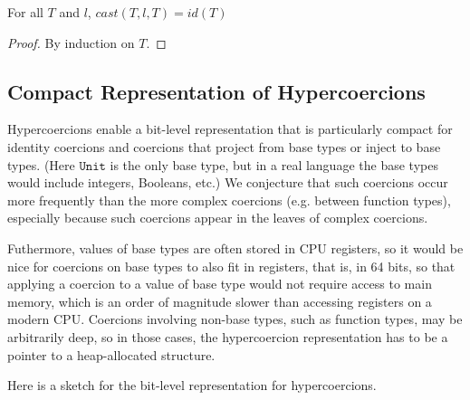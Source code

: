 \documentclass[acmsmall,review]{acmart}\settopmatter{printfolios=true,printccs=false,printacmref=false}
\newcommand{\lazyUD}{Lazy\;UD}
\newcommand{\POOunit}[0]{\mathtt{Unit}}
\begin{document}
\begin{proposition}[\lazyUD{} Identity Casts]
  For all $T$ and $l$, $cast(T,l,T) = id(T) $
\end{proposition}
\begin{proof}
  By induction on $T$.
\end{proof}


\subsection{Compact Representation of Hypercoercions}

Hypercoercions enable a bit-level representation that is particularly
compact for identity coercions and coercions that project from base
types or inject to base types.  (Here $\POOunit$ is the only base
type, but in a real language the base types would include integers,
Booleans, etc.)  We conjecture that such coercions occur more
frequently than the more complex coercions (e.g. between function
types), especially because such coercions appear in the leaves of
complex coercions.

Futhermore, values of base types are often stored in CPU registers, so
it would be nice for coercions on base types to also fit in registers,
that is, in 64 bits, so that applying a coercion to a value of base
type would not require access to main memory, which is an order of
magnitude slower than accessing registers on a modern CPU.
%
Coercions involving non-base types, such as function types, may be
arbitrarily deep, so in those cases, the hypercoercion representation
has to be a pointer to a heap-allocated structure.

Here is a sketch for the bit-level representation for hypercoercions.
\end{document}
